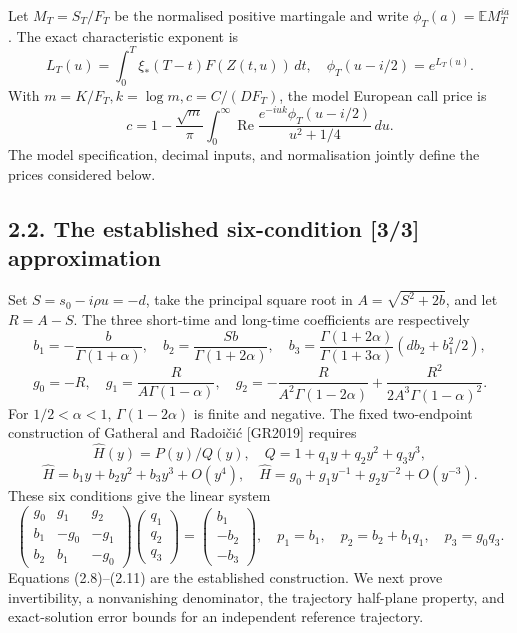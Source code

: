 \documentclass[a4paper,11pt]{article}
\begin{document}
Let \(M_T=S_T/F_T\) be the normalised positive martingale and write \(\phi_T(a)=\mathbb E M_T^{ia}\). The exact characteristic exponent is
\[
L_T(u)=\int_0^T\xi_*(T-t)F(Z(t,u))\,dt,\quad
\phi_T(u-i/2)=e^{L_T(u)}.
\tag{2.6}
\]
With \(m=K/F_T,k=\log m,c=C/(DF_T)\), the model European call price is
\[
c=1-\frac{\sqrt m}{\pi}\int_0^\infty
\operatorname{Re}\frac{e^{-iuk}\phi_T(u-i/2)}{u^2+1/4}\,du.
\tag{2.7}
\]
The model specification, decimal inputs, and normalisation jointly define the prices considered below.

\subsection*{2.2. The established six-condition [3/3] approximation}

Set \(S=s_0-i\rho u=-d\), take the principal square root in \(A=\sqrt{S^2+2b}\), and let \(R=A-S\). The three short-time and long-time coefficients are respectively
\[
b_1=-\frac b{\Gamma(1+\alpha)},\quad
b_2=\frac{Sb}{\Gamma(1+2\alpha)},\quad
b_3=\frac{\Gamma(1+2\alpha)}{\Gamma(1+3\alpha)}
       (d b_2+b_1^2/2),
\tag{2.8}
\]
\[
g_0=-R,\quad g_1=\frac R{A\Gamma(1-\alpha)},\quad
g_2=-\frac R{A^2\Gamma(1-2\alpha)}
       +\frac{R^2}{2A^3\Gamma(1-\alpha)^2}.
\tag{2.9}
\]
For \(1/2<\alpha<1\), \(\Gamma(1-2\alpha)\) is finite and negative. The fixed two-endpoint construction of Gatheral and Radoičić [GR2019] requires
\[
\widehat H(y)=P(y)/Q(y),\quad
Q=1+q_1y+q_2y^2+q_3y^3,
\]
\[
\widehat H=b_1y+b_2y^2+b_3y^3+O(y^4),\quad
\widehat H=g_0+g_1y^{-1}+g_2y^{-2}+O(y^{-3}).
\tag{2.10}
\]
These six conditions give the linear system
\[
\begin{pmatrix}g_0&g_1&g_2\\b_1&-g_0&-g_1\\
b_2&b_1&-g_0\end{pmatrix}
\begin{pmatrix}q_1\\q_2\\q_3\end{pmatrix}
=\begin{pmatrix}b_1\\-b_2\\-b_3\end{pmatrix},
\quad p_1=b_1,\quad p_2=b_2+b_1q_1,\quad p_3=g_0q_3.
\tag{2.11}
\]
Equations (2.8)–(2.11) are the established construction. We next prove invertibility, a nonvanishing denominator, the trajectory half-plane property, and exact-solution error bounds for an independent reference trajectory.
\end{document}
